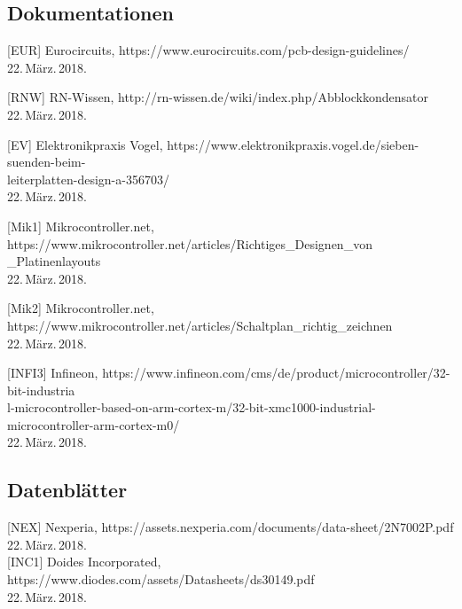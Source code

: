 \subsection{Dokumentationen}

{ {[EUR] {Eurocircuits}}, {https://www.eurocircuits.com/pcb-design-guidelines/ }
\\ {22.\,März.\,2018}.\\

{ {[RNW] {RN-Wissen}}, {http://rn-wissen.de/wiki/index.php/Abblockkondensator }
\\ {22.\,März.\,2018}.\\

{ {[EV] {Elektronikpraxis Vogel}}, {https://www.elektronikpraxis.vogel.de/sieben-suenden-beim-\\leiterplatten-design-a-356703/ }
\\ {22.\,März.\,2018}.\\

{ {[Mik1] {Mikrocontroller.net}}, { https://www.mikrocontroller.net/articles/Richtiges\_Designen\_von\\
\_Platinenlayouts }
\\ {22.\,März.\,2018}.\\

{ {[Mik2] {Mikrocontroller.net}}, {https://www.mikrocontroller.net/articles/Schaltplan\_richtig\_zeichnen }
\\ {22.\,März.\,2018}.\\

{ {[INFI3] {Infineon}}, {https://www.infineon.com/cms/de/product/microcontroller/32-bit-industria\\
l-microcontroller-based-on-arm-cortex-m/32-bit-xmc1000-industrial-microcontroller-arm-cortex-m0/   }
\\ {22.\,März.\,2018}.\\

\subsection{Datenblätter}

{ {[NEX] {Nexperia}}, {https://assets.nexperia.com/documents/data-sheet/2N7002P.pdf}
\\ {22.\,März.\,2018}.\\

{{[INC1] {Doides Incorporated}}, {https://www.diodes.com/assets/Datasheets/ds30149.pdf}
\\{22.\,März.\,2018}.\\

}}}}}}}}
